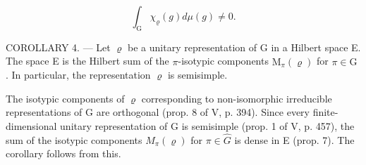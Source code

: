 \[
\int_ {\mathrm{G}} \chi_ {\varrho} (g) d \mu (g) \neq 0.
\]

COROLLARY 4. --- Let \(\varrho\) be a unitary representation of G in a Hilbert space E. The space E is the Hilbert sum of the \(\pi\)-isotypic components \(\mathrm{M}_{\pi}(\varrho)\) for \(\pi \in \widehat{\mathrm{G}}\) . In particular, the representation \(\varrho\) is semisimple.

The isotypic components of \(\varrho\) corresponding to non-isomorphic irreducible representations of G are orthogonal (prop. 8 of V, p. 394). Since every finite-dimensional unitary representation of G is semisimple (prop. 1 of V, p. 457), the sum of the isotypic components \(M_{\pi}(\varrho)\) for \(\pi \in \widehat{G}\) is dense in E (prop. 7). The corollary follows from this.
\relax{}
